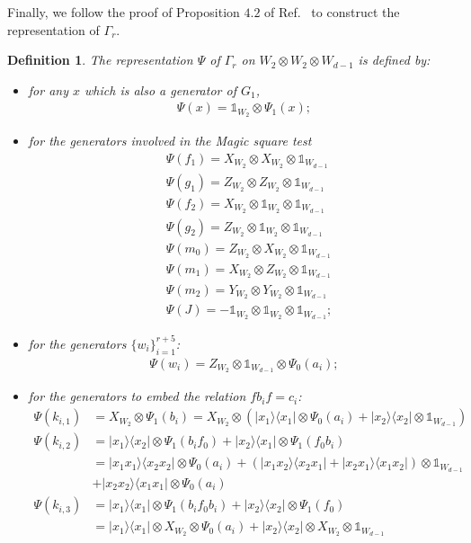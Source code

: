 \documentclass[11pt,letterpaper]{article}
\newcommand{\ketbra}[2]{|#1\rangle\langle#2|}
\newcommand{\x}{\otimes}
\newcommand{\1}{\mathbb{1}}
\newtheorem{definition}[theorem]{Definition}
\theoremstyle{definition}
\begin{document}
Finally, we follow the proof of Proposition $4.2$ of Ref.~\cite{slofstra2017} to construct the 
representation of $\Gamma_r$.
\begin{definition}
\label{def:rep_gamma}
The representation $\Psi$ of $\Gamma_r$ on $W_2 \x W_2 \x W_{d-1}$ is defined by:
\begin{itemize}
\item for any $x$ which is also a generator of $G_1$,
\begin{align*}
	\Psi(x) = \1_{W_2} \x \Psi_1(x);
\end{align*}
\item for the generators involved in the Magic square test
\begin{align*}
	&\Psi(f_1) = X_{W_2} \x X_{W_2} \x \1_{W_{d-1}} \\
	&\Psi(g_1) = Z_{W_2} \x Z_{W_2} \x \1_{W_{d-1}} \\
	&\Psi(f_2) = X_{W_2} \x \1_{W_2} \x \1_{W_{d-1}} \\
	&\Psi(g_2) = Z_{W_2} \x \1_{W_2} \x \1_{W_{d-1}} \\
	& \Psi(m_0) = Z_{W_2} \x X_{W_2} \x \1_{W_{d-1}}\\
	& \Psi(m_1) = X_{W_2} \x Z_{W_2} \x \1_{W_{d-1}}\\
	& \Psi(m_2) = Y_{W_2} \x Y_{W_2} \x \1_{W_{d-1}}\\
	& \Psi(J) = - \1_{W_2} \x \1_{W_2} \x \1_{W_{d-1}};
\end{align*}
\item for the generators $\{ w_i \}_{i=1}^{r+5}$:
\begin{align*}
	\Psi(w_i) = Z_{W_2} \x \1_{W_{d-1}} \x \Psi_0(a_i);
\end{align*}
\item for the generators to embed the relation $f b_i f = c_i$:
\begin{align*}
	\Psi(k_{i,1}) &= X_{W_2} \x \Psi_1(b_i) = X_{W_2} \x ( \ketbra{x_1}{x_1} \x \Psi_0(a_i) + \ketbra{x_2}{x_2} \x \1_{W_{d-1}} )\\
	\Psi(k_{i,2}) &= \ketbra{x_1}{x_2} \x \Psi_1(b_if_0) + \ketbra{x_2}{x_1} \x \Psi_1(f_0b_i)\\
	&= \ketbra{x_1x_1}{x_2x_2} \x \Psi_0(a_i) + (\ketbra{x_1x_2}{x_2x_1}+\ketbra{x_2x_1}{x_1x_2})\x\1_{W_{d-1}}\\
	&+ \ketbra{x_2x_2}{x_1x_1} \x \Psi_0(a_i)\\ 
	\Psi(k_{i,3}) &= \ketbra{x_1}{x_1} \x \Psi_1(b_if_0b_i) + \ketbra{x_2}{x_2} \x \Psi_1(f_0) \\
	&= \ketbra{x_1}{x_1} \x X_{W_2} \x \Psi_0(a_i) +  \ketbra{x_2}{x_2} \x X_{W_2} \x \1_{W_{d-1}}\\

\end{align*}
\end{itemize}
\end{definition}
\end{document}
